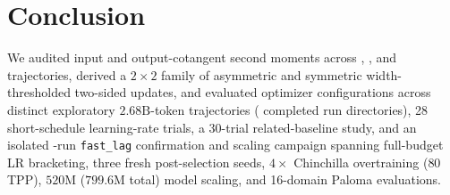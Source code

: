 \section{Conclusion}

We audited input and output-cotangent second moments across ,
, and  trajectories, derived a $2\times 2$ family
of asymmetric and symmetric width-thresholded two-sided updates, and evaluated
\nOptimizerArms{} optimizer configurations across \nDistinctRuns{} distinct
exploratory $2.68\text{B}$-token trajectories (\nRunDirs{} completed run
directories), 28 short-schedule learning-rate trials, a 30-trial
related-baseline study, and an isolated \confTotalRuns{}-run \texttt{fast\_lag}
confirmation and scaling campaign spanning full-budget LR bracketing, three
fresh post-selection seeds, $4\times$ Chinchilla overtraining ($80$ TPP),
$520\text{M}$ ($799.6\text{M}$ total) model scaling, and \confPalomaCount{}
16-domain Paloma evaluations.

